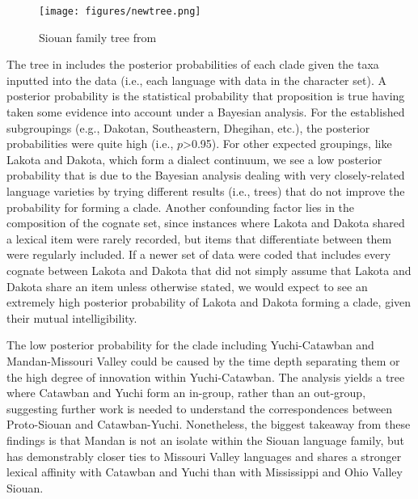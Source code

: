 \begin{figure}
\caption{Siouan family tree from \citet{kasak2015}}
\label{newtree}

\texttt{[image: figures/newtree.png]}

\end{figure}

The tree in  includes the posterior probabilities of each clade given the taxa inputted into the data (i.e., each language with data in the character set). A posterior probability is the statistical probability that proposition is true having taken some evidence into account under a Bayesian analysis. For the established subgroupings (e.g., Dakotan, Southeastern, Dhegihan, etc.), the posterior probabilities were quite high (i.e., $p$>0.95). For other expected groupings, like Lakota and Dakota, which form a dialect continuum, we see a low posterior probability that is due to the Bayesian analysis dealing with very closely-related language varieties by trying different results (i.e., trees) that do not improve the probability for forming a clade. Another confounding factor lies in the composition of the cognate set, since instances where Lakota and Dakota shared a lexical item were rarely recorded, but items that differentiate between them were regularly included. If a newer set of data were coded that includes every cognate between Lakota and Dakota that did not simply assume that Lakota and Dakota share an item unless otherwise stated, we would expect to see an extremely high posterior probability of Lakota and Dakota forming a clade, given their mutual intelligibility.

The low posterior probability for the clade including Yuchi-Catawban and Mandan-Missouri Valley could be caused by the time depth separating them or the high degree of innovation within Yuchi-Catawban. The analysis yields a tree where Catawban and Yuchi form an in-group, rather than an out-group, suggesting further work is needed to understand the correspondences between Proto-Siouan and Catawban-Yuchi. Nonetheless, the biggest takeaway from these findings is that Mandan is not an isolate within the Siouan language family, but has demonstrably closer ties to Missouri Valley languages and shares a stronger lexical affinity with Catawban and Yuchi than with Mississippi and Ohio Valley Siouan.

